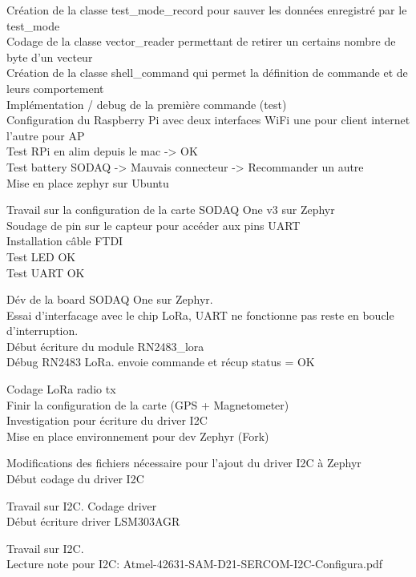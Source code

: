 \begin{multicols}{2}
Création de la classe test\_mode\_record pour sauver les données enregistré par le test\_mode\\
Codage de la classe vector\_reader permettant de retirer un certains nombre de byte d’un vecteur\\
Création de la classe shell\_command qui permet la définition de commande et de leurs comportement\\
Implémentation / debug de la première commande (test)\\

Configuration du Raspberry Pi avec deux interfaces WiFi une pour client internet l’autre pour AP\\
Test RPi en alim depuis le mac -> OK\\
Test battery SODAQ -> Mauvais connecteur -> Recommander un autre\\
Mise en place zephyr sur Ubuntu

Travail sur la configuration de la carte SODAQ One v3 sur Zephyr\\
Soudage de pin sur le capteur pour accéder aux pins UART\\
Installation câble FTDI\\
Test LED OK\\
Test UART OK

Dév de la board SODAQ One sur Zephyr.\\
Essai d’interfacage avec le chip LoRa, UART ne fonctionne pas reste en boucle d’interruption.\\
Début écriture du module RN2483\_lora\\
Débug RN2483 LoRa. envoie commande et récup status = OK

Codage LoRa radio tx\\
Finir la configuration de la carte (GPS + Magnetometer)\\
Investigation pour écriture du driver I2C\\
Mise en place environnement pour dev Zephyr (Fork)

Modifications des fichiers nécessaire pour l’ajout du driver I2C à Zephyr\\
Début codage du driver I2C

Travail sur I2C. Codage driver\\
Début écriture driver LSM303AGR

Travail sur I2C. \\
Lecture note pour I2C: Atmel-42631-SAM-D21-SERCOM-I2C-Configura.pdf


\end{multicols}
